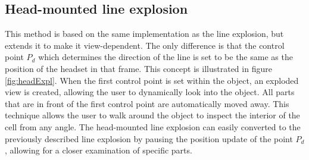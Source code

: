 \subsection{Head-mounted line explosion}
This method is based on the same implementation as the line explosion, but extends it to make it view-dependent. 
The only difference is that the control point $P_d$ which determines the direction of the line is set to be the same as the position of the headset in that frame. This concept is illustrated in figure \ref{fig:headExpl}.
When the first control point is set within the object, an exploded view is created, allowing the user to dynamically look into the object. 
All parts that are in front of the first control point are automatically moved away. 
This technique allows the user to walk around the object to inspect the interior of the cell from any angle.
The head-mounted line explosion can easily converted to the previously described line explosion by pausing the position update of the point $P_d$, allowing for a closer examination of specific parts. 

